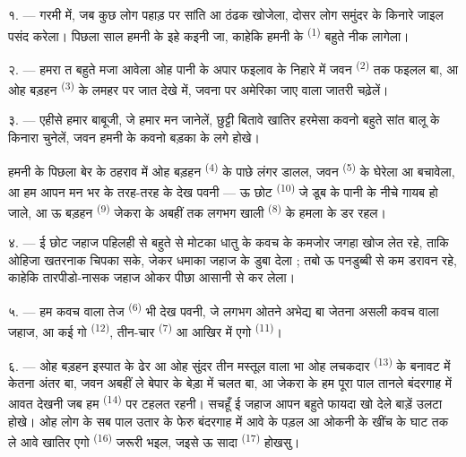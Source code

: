 १. --- गरमी में, जब कुछ लोग पहाड़ पर सांति आ ठंढक खोजेला, दोसर लोग
समुंदर के किनारे जाइल पसंद करेला। पिछला साल हमनी के इहे कइनी जा,
काहेकि हमनी के  \textsuperscript{(1)} बहुते नीक लागेला।

२. --- हमरा त बहुते मजा आवेला ओह पानी के अपार फइलाव के निहारे में जवन
 \textsuperscript{(2)} तक फइलल बा, आ ओह बड़हन  \textsuperscript{(3)} के लमहर  पर जात
देखे में, जवना पर अमेरिका जाए वाला जातरी चढ़ेलें।

३. --- एहीसे हमार बाबूजी, जे हमार मन जानेलें, छुट्टी बितावे खातिर
हरमेसा कवनो बहुते सांत बालू के किनारा चुनेलें, जवन हमनी के कवनो बड़का
 के लगे होखे।

हमनी के पिछला बेर के ठहराव में  ओह बड़हन
 \textsuperscript{(4)} के पाछे लंगर डालल, जवन  \textsuperscript{(5)} के घेरेला आ बचावेला, आ हम आपन मन भर के
तरह-तरह के  देख पवनी — ऊ छोट 
\textsuperscript{(10)} जे डूब के पानी के नीचे गायब हो जाले, आ ऊ बड़हन
 \textsuperscript{(9)} जेकरा के अबहीं तक लगभग खाली
 \textsuperscript{(8)} के हमला के डर रहल।

\VUsaut{3.0mm}
\VUsaut{3.0mm}

४. --- ई छोट जहाज पहिलही से बहुते  से मोटका धातु के कवच
के कमजोर जगहा खोज लेत रहे, ताकि ओहिजा खतरनाक  चिपका
सके, जेकर धमाका जहाज के डुबा देला ; तबो ऊ पनडुब्बी से कम डरावन रहे,
काहेकि तारपीडो-नासक जहाज ओकर पीछा आसानी से कर लेला।

५. --- हम कवच वाला तेज  \textsuperscript{(6)} भी देख पवनी,
जे लगभग ओतने अभेद्य बा जेतना असली कवच वाला जहाज, आ कई गो  \textsuperscript{(12)}, तीन-चार 
\textsuperscript{(7)} आ आखिर में एगो  \textsuperscript{(11)}।

६. --- ओह बड़हन इस्पात के ढेर आ ओह सुंदर तीन मस्तूल वाला भा ओह लचकदार
 \textsuperscript{(13)} के बनावट में केतना अंतर बा,
जवन अबहीं ले बेपार के बेड़ा में चलत बा, आ जेकरा के हम पूरा पाल तानले
बंदरगाह में आवत देखनी जब हम  \textsuperscript{(14)} पर टहलत
रहनी। सचहूँ ई जहाज आपन बहुते फायदा खो देले बाड़ें 
 उलटा होखे। ओह लोग के सब पाल उतार के फेरु बंदरगाह में आवे
के पड़ल आ ओकनी के खींच के घाट तक ले आवे खातिर एगो  \textsuperscript{(16)} जरूरी भइल, जइसे ऊ सादा 
\textsuperscript{(17)} होखसु।

